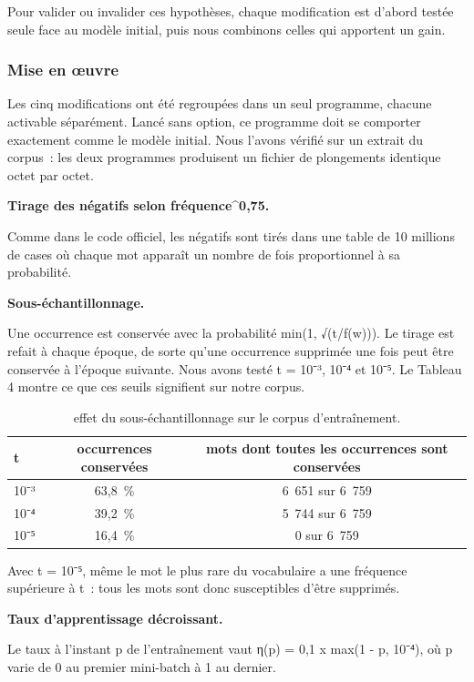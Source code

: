 \documentclass[11pt,a4paper]{article}
\begin{document}
Pour valider ou invalider ces hypothèses, chaque modification est d’abord testée seule face au modèle initial, puis nous combinons celles qui apportent un gain.

\subsubsection{Mise en œuvre}

Les cinq modifications ont été regroupées dans un seul programme, chacune activable séparément. Lancé sans option, ce programme doit se comporter exactement comme le modèle initial. Nous l’avons vérifié sur un extrait du corpus~: les deux programmes produisent un fichier de plongements identique octet par octet.

\textbf{Tirage des négatifs selon fréquence\textasciicircum{}0,75.}\nopagebreak

Comme dans le code officiel, les négatifs sont tirés dans une table de 10 millions de cases où chaque mot apparaît un nombre de fois proportionnel à sa probabilité.

\textbf{Sous-échantillonnage.}\nopagebreak

Une occurrence est conservée avec la probabilité min(1, √(t/f(w))). Le tirage est refait à chaque époque, de sorte qu’une occurrence supprimée une fois peut être conservée à l’époque suivante. Nous avons testé t = 10⁻³, 10⁻⁴ et 10⁻⁵. Le Tableau 4 montre ce que ces seuils signifient sur notre corpus.

\begin{table}[!htbp]
\centering
\small
\caption{effet du sous-échantillonnage sur le corpus d’entraînement.}
\begin{tabular}{lcc}
\toprule
\textbf{t} & \textbf{occurrences conservées} & \textbf{mots dont toutes les occurrences sont conservées} \\
\midrule
10⁻³ & 63,8~\% & 6~651 sur 6~759 \\
10⁻⁴ & 39,2~\% & 5~744 sur 6~759 \\
10⁻⁵ & 16,4~\% & 0 sur 6~759 \\
\bottomrule
\end{tabular}
\end{table}

Avec t = 10⁻⁵, même le mot le plus rare du vocabulaire a une fréquence supérieure à t~: tous les mots sont donc susceptibles d’être supprimés.

\textbf{Taux d’apprentissage décroissant.}\nopagebreak

Le taux à l’instant p de l’entraînement vaut η(p) = 0,1 x max(1 - p, 10⁻⁴), où p varie de 0 au premier mini-batch à 1 au dernier.
\end{document}
